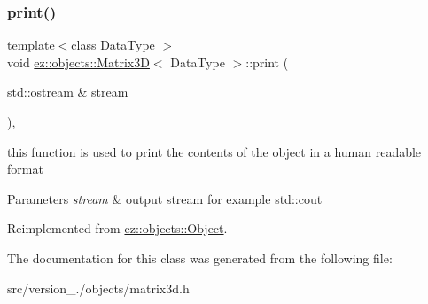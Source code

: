\subsubsection{\texorpdfstring{print()}{print()}}
{\footnotesize\ttfamily template$<$class Data\+Type $>$ \\
void \hyperlink{classez_1_1objects_1_1Matrix3D}{ez\+::objects\+::\+Matrix3D}$<$ Data\+Type $>$\+::print (\begin{DoxyParamCaption}\item[{std\+::ostream \&}]{stream }\end{DoxyParamCaption})\hspace{0.3cm}{\ttfamily [inline]}, {\ttfamily [virtual]}}

this function is used to print the contents of the object in a human readable format 
\begin{DoxyParams}{Parameters}
{\em stream} & output stream for example std\+::cout \\
\hline
\end{DoxyParams}


Reimplemented from \hyperlink{classez_1_1objects_1_1Object_a9e20f39a78163f67f000576149d858b3}{ez\+::objects\+::\+Object}.



The documentation for this class was generated from the following file\+:\begin{DoxyCompactItemize}
\item 
src/version\+\_./objects/matrix3d.\+h\end{DoxyCompactItemize}
